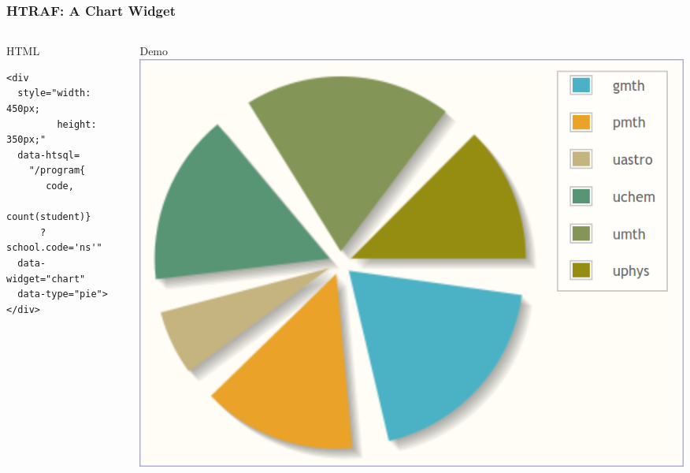 \documentclass{beamer}
\begin{document}
\begin{frame}[containsverbatim]
\frametitle{HTRAF: A Chart Widget}
\begin{columns}[c]
\begin{column}[T]{.5\textwidth}
\begin{block}{HTML}
\small
\begin{lstlisting}
<div
  style="width: 450px;
         height: 350px;"
  data-htsql=
    "/program{
       code,
       count(student)}
      ?school.code='ns'"
  data-widget="chart"
  data-type="pie">
</div>
\end{lstlisting}
\end{block}
\end{column}
\begin{column}[T]{.5\textwidth}
\begin{block}{Demo}
\includegraphics[width=\textwidth]{img/htraf-3.png}
\end{block}
\end{column}
\end{columns}
\end{frame}
\end{document}
